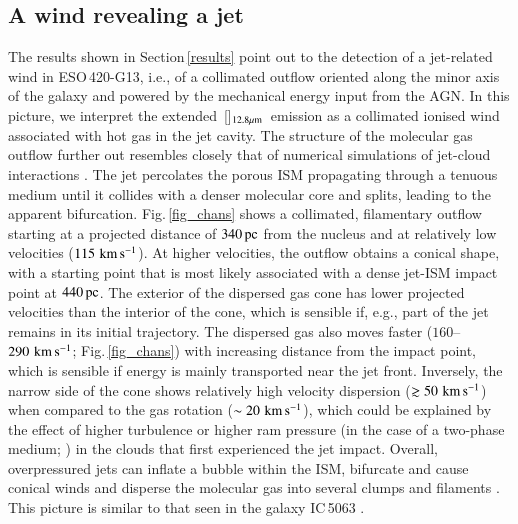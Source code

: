 \documentclass[longauth]{aa}
\newcommand{\kms}{\,\hbox{\hbox{km}\,\hbox{s}$^{-1}$}}
\newcommand{\neii}{\,\hbox{[\ion{Ne}{ii}]$_{\rm 12.8 \mu m}$}}
\begin{document}
\subsection{A wind revealing a jet}\label{windjet}
The results shown in Section\,\ref{results} point out to the detection of a jet-related wind in ESO\,420-G13, i.e., of a collimated outflow oriented along the minor axis of the galaxy and powered by the mechanical energy input from the AGN. In this picture, we interpret the extended \neii\ emission as a collimated ionised wind associated with hot gas in the jet cavity. The structure of the molecular gas outflow further out resembles closely that of numerical simulations of jet-cloud interactions . The jet percolates the porous ISM propagating through a tenuous medium until it collides with a denser molecular core and splits, leading to the apparent bifurcation. Fig.\,\ref{fig_chans} shows a collimated, filamentary outflow starting at a projected distance of $340\, \rm{pc}$ from the nucleus and at relatively low velocities ($115\, \rm{\kms}$). At higher velocities, the outflow obtains a conical shape, with a starting point that is most likely associated with a dense jet-ISM impact point at $440\, \rm{pc}$. The exterior of the dispersed gas cone has lower projected velocities than the interior of the cone, which is sensible if, e.g., part of the jet remains in its initial trajectory. The dispersed gas also moves faster ($160$--$290\, \rm{\kms}$; Fig.\,\ref{fig_chans}) with increasing distance from the impact point, which is sensible if energy is mainly transported near the jet front. Inversely, the narrow side of the cone shows relatively high velocity dispersion ($\gtrsim 50\, \rm{\kms}$) when compared to the gas rotation ($\sim 20\, \rm{\kms}$), which could be explained by the effect of higher turbulence   or higher ram pressure (in the case of a two-phase medium; ) in the clouds that first experienced the jet impact. Overall, overpressured jets can inflate a bubble within the ISM, bifurcate and cause conical winds and disperse the molecular gas into several clumps and filaments . This picture is similar to that seen in the galaxy IC\,5063 .
\end{document}
